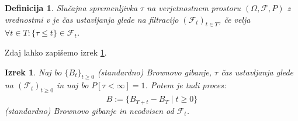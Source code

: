 \documentclass[11pt]{article}
\newcommand{\f}{\mathcal{F}}
\newtheorem{definicija}{Definicija}
\newtheorem{izrek}{Izrek}
\begin{document}

    \begin{definicija}
        Slučajna spremenljivka $\tau$ na verjetnostnem prostoru \((\Omega, \f, P)\) z vrednostmi v %
        je čas ustavljanja glede na filtracijo \((\f_t)_{t\in T}\), če velja \(\forall t \in T : \{\tau \leq t \} \in \f_t \).
    \end{definicija}
    
    Zdaj lahko zapišemo izrek \ref{thm:stopped_brownian}. %
    
    \begin{izrek}
        \label{thm:stopped_brownian}
        Naj bo $\{B_t\}_{t \geq 0}$ (standardno) Brownovo gibanje, $\tau$ čas ustavljanja glede na 
        \((\f_t)_{t \geq 0}\) in naj bo \(P[\tau < \infty] = 1\).
        Potem je tudi proces:
        \[
        \hat{B} := \{B_{T+t} - B_T \mid t \geq 0\}
        \]
        (standardno) Brownovo gibanje in neodvisen od \(\f_t\).
    \end{izrek}
    



\end{document}
